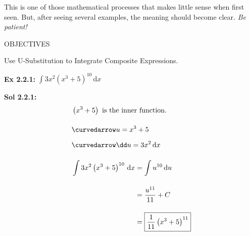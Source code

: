 This is one of those mathematical processes that makes little sense when first seen. But, after seeing several examples, the meaning should become clear. \textit{Be patient!} \par

\begin{tcolorbox}[objective]
    \begin{center}
        OBJECTIVES \\[11pt]
    \end{center}
    Use U-Substitution to Integrate Composite Expressions. 
\end{tcolorbox} \vspace{11pt}

\begin{tcolorbox}[example]
    \textbf{Ex 2.2.1: } $\int 3x^2\left(x^3 + 5\right)^{10} \,\mathrm{d}x$
\end{tcolorbox}
\begin{tcolorbox}[solution]
    \textbf{Sol 2.2.1: } \begin{align*}
        & \left(x^3 + 5\right) \text{ is the inner function.} \\[11pt]
        & \curvedarrow u = x^3 + 5 \\[5.5pt]
        & \curvedarrow \dd u = 3x^2 \,\mathrm{d}x \\[11pt]
        & \int 3x^2\left(x^3 + 5\right)^{10} \,\mathrm{d}x \begin{aligned}[t]
            & = \int u^{10} \,\mathrm{d}u \\[11pt]
            & = \dfrac{u^{11}}{11} + C \\[11pt]
            & = \boxed{\dfrac{1}{11}\left(x^3 + 5\right)^{11}}
        \end{aligned}
    \end{align*}
\end{tcolorbox} \vspace{11pt}

